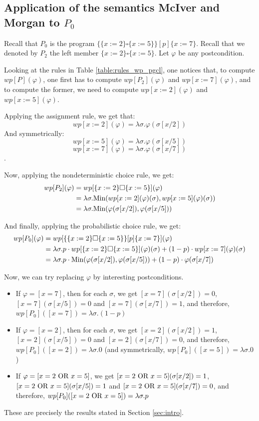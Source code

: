 \documentclass[a4paper,10pt]{llncs}
\def\Min {\textnormal {Min}}
\begin{document}
\subsection{Application of the semantics McIver and Morgan to $P_0$}
\label{subsec:wp_p0}
Recall that $P_0$ is the program $\{ \{x := 2\} \square \{x := 5\} \} [p] \{ x := 7 \}$. Recall that we denoted by $P_2$ the left member $\{x := 2\} \square \{x := 5\}$. Let $\varphi$ be any postcondition.\bigskip

Looking at the rules in Table \ref{table:rules_wp_pgcl}, one notices that, to compute $wp[P](\varphi)$, one first has to compute $wp[P_2](\varphi)$ and $wp[x := 7](\varphi)$, and to compute the former, we need to compute $wp[x := 2](\varphi)$ and $wp[x := 5](\varphi)$.\bigskip

Applying the assignment rule, we get that:
$$wp[x := 2](\varphi) = \lambda\sigma.\varphi(\sigma[x/2])$$
And symmetrically: 
$$wp[x := 5](\varphi) = \lambda\sigma.\varphi(\sigma[x/5])$$
$$wp[x := 7](\varphi) = \lambda\sigma.\varphi(\sigma[x/7])$$.

Now, applying the nondeterministic choice rule, we get:
\begin{align*}
wp[P_2](\varphi) &= wp[\{x := 2\} \square \{x := 5\}](\varphi) \\
&= \lambda\sigma.\Min(wp[x := 2](\varphi)(\sigma),wp[x := 5](\varphi)(\sigma)) \\
&= \lambda\sigma. \Min(\varphi(\sigma[x/2]),\varphi(\sigma[x/5]))
\end{align*}

And finally, applying the probabilistic choice rule, we get:
\begin{align*}
wp[P_0](\varphi) &= wp[\{ \{x := 2\} \square \{x := 5\} \} [p] \{ x := 7 \}](\varphi)\\
&= \lambda\sigma. p \cdot wp[\{x := 2\} \square \{x := 5\}](\varphi)(\sigma) + (1-p) \cdot wp[x := 7](\varphi)(\sigma)\\
&= \lambda\sigma. p \cdot \Min(\varphi(\sigma[x/2]),\varphi(\sigma[x/5])) + (1-p) \cdot \varphi(\sigma[x/7])
\end{align*}

Now, we can try replacing $\varphi$ by interesting postconditions.
\begin{itemize}
\item If $\varphi = [x = 7]$, then for each $\sigma$, we get $[x = 7](\sigma[x/2]) = 0$, $[x = 7](\sigma[x/5]) = 0$ and $[x = 7](\sigma[x/7]) = 1$, and therefore, $wp[P_0]([x = 7]) = \lambda\sigma. (1-p)$
\item If $\varphi = [x = 2]$, then for each $\sigma$, we get $[x = 2](\sigma[x/2]) = 1$, $[x = 2](\sigma[x/5]) = 0$ and $[x = 2](\sigma[x/7]) = 0$, and therefore, $wp[P_0]([x = 2]) = \lambda\sigma. 0$ (and symmetrically, $wp[P_0]([x = 5]) = \lambda\sigma. 0$)
\item If $\varphi = [x = 2 \textnormal{ OR } x = 5]$, we get $[x = 2 \textnormal{ OR } x = 5](\sigma[x/2]) = 1$, $[x = 2 \textnormal{ OR } x = 5](\sigma[x/5]) = 1$ and $[x = 2 \textnormal{ OR } x = 5](\sigma[x/7]) = 0$, and therefore, $wp[P_0]([x = 2 \textnormal{ OR } x = 5]) = \lambda\sigma. p$
\end{itemize}
These are precisely the results stated in Section \ref{sec:intro}.
\end{document}
